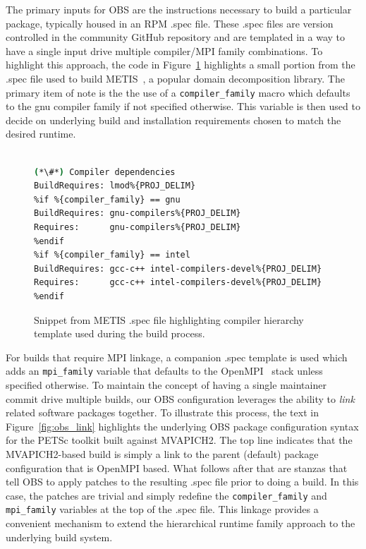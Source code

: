 \documentclass{sig-alternate-05-2015}
\begin{document}
The primary inputs for OBS are the instructions necessary to build a particular
package, typically housed in an RPM .spec file. These .spec files are version controlled in the
community GitHub repository and are templated in a way to have a single input
drive multiple compiler/MPI family combinations.  To highlight this approach,
the code in Figure~\ref{fig:metis_spec} highlights a small portion from the .spec file used to build
METIS~\cite{Karypis:1998}, a popular domain decomposition library. The primary
item of note is the the use of a \texttt{compiler\_family} macro which defaults
to the gnu compiler family if not specified otherwise.  This variable is then used
to decide on underlying build and installation requirements chosen to match the
desired runtime.

\begin{figure}[h]
\begin{lstlisting}[language=bash,keywords={},basicstyle=\fontsize{7.8}{10}\ttfamily,keepspaces]
%{!?compiler_family: %define compiler_family gnu}

(*\#*) Compiler dependencies
BuildRequires: lmod%{PROJ_DELIM}
%if %{compiler_family} == gnu
BuildRequires: gnu-compilers%{PROJ_DELIM}
Requires:      gnu-compilers%{PROJ_DELIM}
%endif
%if %{compiler_family} == intel
BuildRequires: gcc-c++ intel-compilers-devel%{PROJ_DELIM}
Requires:      gcc-c++ intel-compilers-devel%{PROJ_DELIM}
%endif
\end{lstlisting}
\vspace*{-0.3cm}
  \caption{Snippet from METIS .spec file highlighting compiler hierarchy
    template used during the build process.}
    \label{fig:metis_spec}
\end{figure}

For builds that require MPI linkage, a companion .spec template is used which
adds an \texttt{mpi\_family} variable that defaults to the
OpenMPI~\cite{gabriel04:openmpi} stack unless specified otherwise.  To
maintain the concept of having a single maintainer commit drive multiple
builds, our OBS configuration leverages the ability to {\em link} related software
packages together. To illustrate this process, the text in
Figure~\ref{fig:obs_link} highlights the underlying
OBS package configuration syntax for the PETSc toolkit built against
MVAPICH2. The top line indicates that the MVAPICH2-based build is simply a link
to the parent (default) package configuration that is OpenMPI based.  What
follows after that are stanzas that tell OBS to apply patches to the resulting
.spec file prior to doing a build. In this case, the patches are trivial and
simply redefine the \texttt{compiler\_family} and \texttt{mpi\_family} variables at
the top of the .spec file.  This linkage provides a convenient mechanism to
extend the hierarchical runtime family approach to the underlying build system.
\end{document}
